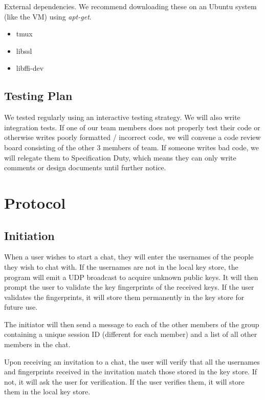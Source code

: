 \documentclass{scrartcl}
\begin{document}
External dependencies. We recommend downloading these on an Ubuntu system (like the VM) using \textit{apt-get}.

\begin{itemize}
 \item tmux
 \item libssl
 \item libffi-dev
\end{itemize}

\subsection{Testing Plan}
We tested regularly using an interactive testing strategy. We will also write integration tests. If one of our team members does not properly test their code or otherwise writes poorly formatted / incorrect code, we will convene a code review board consisting of the other 3 members of team. If someone writes bad code, we will relegate them to Specification Duty, which means they can only write comments or design documents until further notice.

\section{Protocol}
\subsection{Initiation}
When a user wishes to start a chat, they will enter the usernames of the people they wish to chat with. If the usernames are not in the local key store, the program will emit a UDP broadcast to acquire unknown public keys. It will then prompt the user to validate the key fingerprints of the received keys. If the user validates the fingerprints, it will store them permanently in the key store for future use.

The initiator will then send a message to each of the other members of the group containing a unique session ID (different for each member) and a list of all other members in the chat.

Upon receiving an invitation to a chat, the user will verify that all the usernames and fingerprints received in the invitation match those stored in the key store. If not, it will ask the user for verification. If the user verifies them, it will store them in the local key store.
\end{document}
